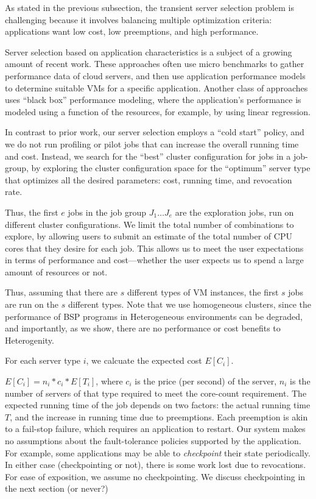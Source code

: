 As stated in the previous subsection, the transient server selection problem is challenging because it involves balancing multiple optimization criteria: applications want low cost, low preemptions, and high performance.

Server selection based on application characteristics is a subject of a growing amount of recent work.
These approaches often use micro benchmarks to gather performance data of cloud servers, and then use application performance models to determine suitable VMs for a specific application.
Another class of approaches uses ``black box'' performance modeling, where the application's performance is modeled using a function of the resources, for example, by using linear regression.

In contrast to prior work, our server selection employs a ``cold start'' policy, and we do not run profiling or pilot jobs that can increase the overall running time and cost.
Instead, we search for the ``best'' cluster configuration for jobs in a job-group, by exploring the cluster configuration space for the ``optimum'' server type that optimizes all the desired parameters: cost, running time, and revocation rate.


Thus, the first $e$ jobs in the job group $J_1\ldots J_e$ are the exploration jobs, run on different cluster configurations.
We limit the total number of combinations to explore, by allowing users to submit an estimate of the total number of CPU cores that they desire for each job.
This allows us to meet the user expectations in terms of performance and cost---whether the user expects us to spend a large amount of resources or not.

Thus, assuming that there are $s$ different types of VM instances, the first $s$ jobs are run on the $s$ different types.
Note that we use homogeneous clusters, since the performance of BSP programs in Heterogeneous environments can be degraded, and importantly, as we show, there are no performance or cost benefits to Heterogenity. 


For each server type $i$, we calcuate the expected cost $E[C_i]$.

$E[C_i] = n_i*c_i * E[T_i]$, where $c_i$ is the price (per second) of the server, $n_i$ is the number of servers of that type required to meet the core-count requirement.
The expected running time of the job depends on two factors: the actual running time $T$, and the increase in running time due to preemptions.
Each preemption is akin to a fail-stop failure, which requires an application to restart.
Our system makes no assumptions about the fault-tolerance policies supported by the application. For example, some applications may be able to \emph{checkpoint} their state periodically.
In either case (checkpointing or not), there is some work lost due to revocations.
For ease of exposition, we assume no checkpointing. We discuss checkpointing in the next section (or never?)


